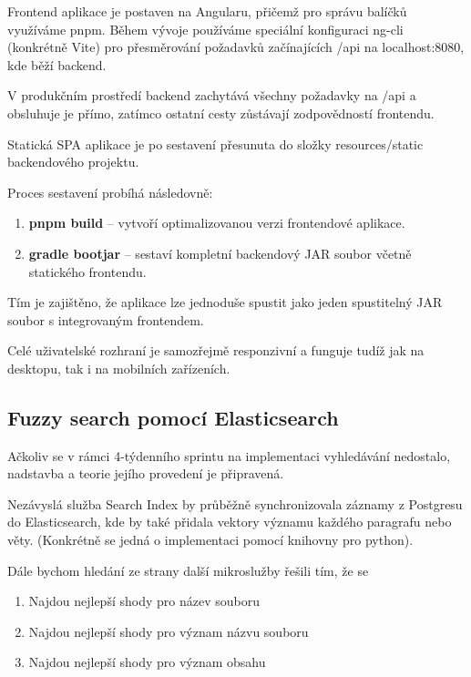 Frontend aplikace je postaven na Angularu, přičemž pro správu balíčků využíváme
pnpm. Během vývoje používáme speciální konfiguraci ng-cli (konkrétně Vite) pro
přesměrování požadavků začínajících /api na localhost:8080, kde běží backend.

V produkčním prostředí backend zachytává všechny požadavky na /api a obsluhuje
je přímo, zatímco ostatní cesty zůstávají zodpovědností frontendu.

Statická SPA aplikace je po sestavení přesunuta do složky resources/static
backendového projektu.

Proces sestavení probíhá následovně:

\begin{enumerate}
    \item \textbf{pnpm build} – vytvoří optimalizovanou verzi frontendové aplikace.
    \item \textbf{gradle bootjar} – sestaví kompletní backendový JAR soubor včetně statického frontendu.
\end{enumerate}

Tím je zajištěno, že aplikace lze jednoduše spustit jako jeden spustitelný JAR
soubor s integrovaným frontendem.

Celé uživatelské rozhraní je samozřejmě responzivní a funguje tudíž jak na desktopu, tak i na mobilních zařízeních.

\subsection{Fuzzy search pomocí Elasticsearch}

Ačkoliv se v rámci 4-týdenního sprintu na implementaci vyhledávání nedostalo,
nadstavba a teorie jejího provedení je připravená.

Nezávyslá služba Search Index by průběžně synchronizovala záznamy z Postgresu
do Elasticsearch, kde by také přidala vektory významu každého paragrafu nebo
věty. (Konkrétně se jedná o implementaci pomocí knihovny  pro python).

Dále bychom hledání ze strany další mikroslužby řešili tím, že se

\begin{enumerate}
    \item Najdou nejlepší shody pro název souboru
    \item Najdou nejlepší shody pro význam názvu souboru
    \item Najdou nejlepší shody pro význam obsahu
\end{enumerate}


